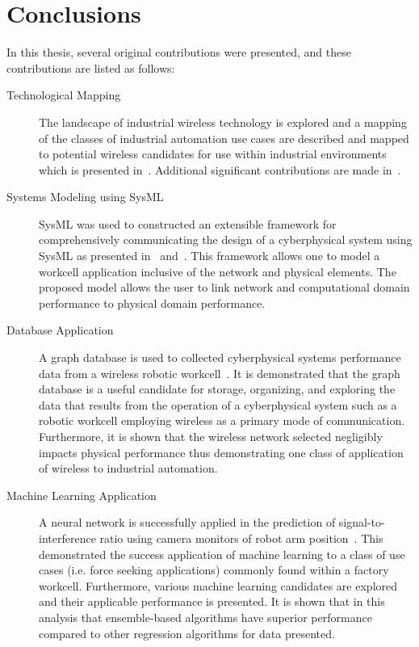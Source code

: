 
\chapter{Conclusions}

In this thesis, several original contributions were presented, and these contributions are listed as follows:

\begin{description}
	\item[Technological Mapping] The landscape of industrial wireless technology is explored and a mapping of the classes of industrial automation use cases are described and mapped to potential wireless candidates for use within industrial environments which is presented in~\cite{CandellRW2017}.  Additional significant contributions are made in~\cite{Candell2018.IWSGuide, Candell2017.SAS.IWSWorkshopReport, Montgomery2019}.
	
	\item[Systems Modeling using SysML] SysML was used to constructed an extensible framework for comprehensively communicating the design of a cyberphysical system using SysML as presented in~\cite{Candell2019ASR.SYSML} and~\cite{Candell2018SysML.DATA}.  This framework allows one to model a workcell application inclusive of the network and physical elements.  The proposed model allows the user to link network and computational domain performance to physical domain performance.
	
	\item[Database Application] A graph database is used to collected cyberphysical systems performance data from a wireless robotic workcell~\cite{CandellISIT2020.Conf}.  It is demonstrated that the graph database is a useful candidate for storage, organizing, and exploring the data that results from the operation of a cyberphysical system such as a robotic workcell employing wireless as a primary mode of communication.  Furthermore, it is shown that the wireless network selected negligibly impacts physical performance thus demonstrating one class of application of wireless to industrial automation.
	
	\item[Machine Learning Application] A neural network is successfully applied in the prediction of signal-to-interference ratio using camera monitors of robot arm position~\cite{CandellISIE2019.Conf, Candell2020.Jrnl.Access}.  This demonstrated the success application of machine learning to a class of use cases (i.e. force seeking applications) commonly found within a factory workcell.  Furthermore, various machine learning candidates are explored and their applicable performance is presented.  It is shown that in this analysis that ensemble-based algorithms have superior performance compared to other regression algorithms for data presented.  
\end{description}


